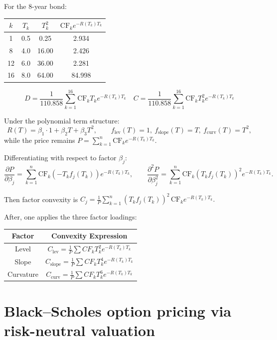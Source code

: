 For the 8-year bond:
\begin{center}
\begin{tabular}{c c c c}
$k$ & $T_k$ & $T_k^2$ & $\text{CF}_k e^{-R(T_k)T_k}$ \\ \hline
1  & 0.5 & 0.25 & 2.934 \\
8  & 4.0 & 16.00 & 2.426 \\
12 & 6.0 & 36.00 & 2.281 \\
16 & 8.0 & 64.00 & 84.998 \\
\end{tabular}
\end{center}
$$
\boxed{D=\frac{1}{110.858}\sum_{k=1}^{16}\text{CF}_k T_k e^{-R(T_k)T_k}}
\quad
\boxed{C=\frac{1}{110.858}\sum_{k=1}^{16}\text{CF}_k T_k^2 e^{-R(T_k)T_k}}
$$

Under the polynomial term structure:
\[
R(T)=\beta_1\cdot1+\beta_2 T+\beta_3 T^2,\qquad
f_{\text{lev}}(T)=1,\ f_{\text{slope}}(T)=T,\ f_{\text{curv}}(T)=T^2,
\]
while the price remains
$
P=\sum_{k=1}^n \text{CF}_k e^{-R(T_k)T_k}.
$

Differentiating with respect to factor $\beta_j$:
\[
\frac{\partial P}{\partial\beta_j}
=\sum_{k=1}^n \text{CF}_k(-T_k f_j(T_k))e^{-R(T_k)T_k},\qquad
\frac{\partial^2 P}{\partial\beta_j^2}
=\sum_{k=1}^n \text{CF}_k(T_k f_j(T_k))^2 e^{-R(T_k)T_k}.
\]

Then factor convexity is 
$
C_j=\frac{1}{P}\sum_{k=1}^n (T_k f_j(T_k))^2 \,\text{CF}_k e^{-R(T_k)T_k}.
$

After, one applies the three factor loadings:

\begin{center}
\begin{tabular}{c c}
Factor & Convexity Expression \\ \hline
Level      & $\displaystyle C_{\text{lev}}=\frac{1}{P}\sum CF_k T_k^2 e^{-R(T_k)T_k}$ \\[4pt]
Slope      & $\displaystyle C_{\text{slope}}=\frac{1}{P}\sum CF_k T_k^4 e^{-R(T_k)T_k}$ \\[4pt]
Curvature  & $\displaystyle C_{\text{curv}}=\frac{1}{P}\sum CF_k T_k^6 e^{-R(T_k)T_k}$ \\
\end{tabular}
\end{center}

\section{Black--Scholes option pricing via risk-neutral valuation}

